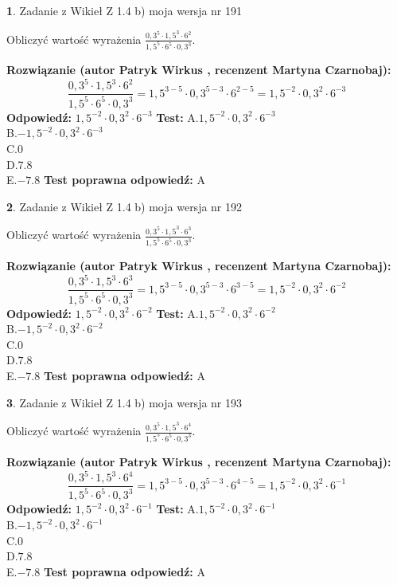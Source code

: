 \documentclass[12pt, a4paper]{article}
\theoremstyle{definition} %
\newtheorem{zad}{}
\newcommand{\zadStart}[1]{\begin{zad}#1\newline}
\newcommand{\zadStop}{\end{zad}}
\newcommand{\rozwStart}[2]{\noindent \textbf{Rozwiązanie (autor #1 , recenzent #2): }\newline}
\newcommand{\rozwStop}{\newline}
\newcommand{\odpStart}{\noindent \textbf{Odpowiedź:}\newline}
\newcommand{\odpStop}{\newline}
\newcommand{\testStart}{\noindent \textbf{Test:}\newline}
\newcommand{\testStop}{\newline}
\newcommand{\kluczStart}{\noindent \textbf{Test poprawna odpowiedź:}\newline}
\newcommand{\kluczStop}{\newline}
\begin{document}
\zadStart{Zadanie z Wikieł Z 1.4 b) moja wersja nr 191}

Obliczyć wartość wyrażenia $\frac{0,3^{5}\cdot1,5^{3}\cdot6^{2}}{1,5^{5}\cdot6^{5}\cdot0,3^{3}}$.
\zadStop
\rozwStart{Patryk Wirkus}{Martyna Czarnobaj}
$$\frac{0,3^{5}\cdot1,5^{3}\cdot6^{2}}{1,5^{5}\cdot6^{5}\cdot0,3^{3}} = 1,5^{3-5} \cdot 0,3^{5-3} \cdot 6^{2-5} = 1,5^{-2} \cdot 0,3^{2} \cdot 6^{-3}$$
\rozwStop
\odpStart
$1,5^{-2} \cdot 0,3^{2} \cdot 6^{-3}$
\odpStop
\testStart
A.$1,5^{-2} \cdot 0,3^{2} \cdot 6^{-3}$\\ B.$-1,5^{-2} \cdot 0,3^{2} \cdot 6^{-3}$\\ C.$0$\\ D.$7.8$\\ E.$-7.8$
\testStop
\kluczStart
A
\kluczStop



\zadStart{Zadanie z Wikieł Z 1.4 b) moja wersja nr 192}

Obliczyć wartość wyrażenia $\frac{0,3^{5}\cdot1,5^{3}\cdot6^{3}}{1,5^{5}\cdot6^{5}\cdot0,3^{3}}$.
\zadStop
\rozwStart{Patryk Wirkus}{Martyna Czarnobaj}
$$\frac{0,3^{5}\cdot1,5^{3}\cdot6^{3}}{1,5^{5}\cdot6^{5}\cdot0,3^{3}} = 1,5^{3-5} \cdot 0,3^{5-3} \cdot 6^{3-5} = 1,5^{-2} \cdot 0,3^{2} \cdot 6^{-2}$$
\rozwStop
\odpStart
$1,5^{-2} \cdot 0,3^{2} \cdot 6^{-2}$
\odpStop
\testStart
A.$1,5^{-2} \cdot 0,3^{2} \cdot 6^{-2}$\\ B.$-1,5^{-2} \cdot 0,3^{2} \cdot 6^{-2}$\\ C.$0$\\ D.$7.8$\\ E.$-7.8$
\testStop
\kluczStart
A
\kluczStop



\zadStart{Zadanie z Wikieł Z 1.4 b) moja wersja nr 193}

Obliczyć wartość wyrażenia $\frac{0,3^{5}\cdot1,5^{3}\cdot6^{4}}{1,5^{5}\cdot6^{5}\cdot0,3^{3}}$.
\zadStop
\rozwStart{Patryk Wirkus}{Martyna Czarnobaj}
$$\frac{0,3^{5}\cdot1,5^{3}\cdot6^{4}}{1,5^{5}\cdot6^{5}\cdot0,3^{3}} = 1,5^{3-5} \cdot 0,3^{5-3} \cdot 6^{4-5} = 1,5^{-2} \cdot 0,3^{2} \cdot 6^{-1}$$
\rozwStop
\odpStart
$1,5^{-2} \cdot 0,3^{2} \cdot 6^{-1}$
\odpStop
\testStart
A.$1,5^{-2} \cdot 0,3^{2} \cdot 6^{-1}$\\ B.$-1,5^{-2} \cdot 0,3^{2} \cdot 6^{-1}$\\ C.$0$\\ D.$7.8$\\ E.$-7.8$
\testStop
\kluczStart
A
\kluczStop
\end{document}
